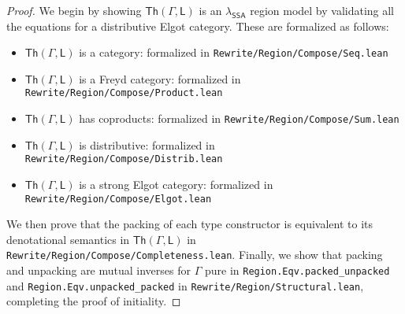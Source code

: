 \documentclass[acmsmall,screen,review]{acmart}
\newcommand{\ms}[1]{\ensuremath{\mathsf{#1}}}
\newcommand{\isotopessa}{\(\lambda_{\ms{SSA}}\)}
\begin{document}
\completenessregions*

\label{proof:complete-reg}

\begin{proof}
  We begin by showing $\ms{Th}(\Gamma, \ms{L})$ is an \isotopessa{} region model by validating all
  the equations for a distributive Elgot category. These are formalized as follows:
  \begin{itemize}
    \item $\ms{Th}(\Gamma, \ms{L})$ is a category: formalized in
    \texttt{Rewrite/Region/Compose/Seq.lean}
    \item $\ms{Th}(\Gamma, \ms{L})$ is a Freyd category: formalized in
    \texttt{Rewrite/Region/Compose/Product.lean}
    \item $\ms{Th}(\Gamma, \ms{L})$ has coproducts: formalized in
    \texttt{Rewrite/Region/Compose/Sum.lean}
    \item $\ms{Th}(\Gamma, \ms{L})$ is distributive: formalized in
    \texttt{Rewrite/Region/Compose/Distrib.lean}
    \item $\ms{Th}(\Gamma, \ms{L})$ is a strong Elgot category: formalized in
    \texttt{Rewrite/Region/Compose/Elgot.lean}
  \end{itemize}
  We then prove that the packing of each type constructor is equivalent to its denotational
  semantics in $\ms{Th}(\Gamma, \ms{L})$ in \texttt{Rewrite/Region/Compose/Completeness.lean}.
  Finally, we show that packing and unpacking are mutual inverses for $\Gamma$ pure in
  \texttt{Region.Eqv.packed_unpacked} and \texttt{Region.Eqv.unpacked_packed} in
  \texttt{Rewrite/Region/Structural.lean}, completing the proof of initiality.
\end{proof}
\end{document}
